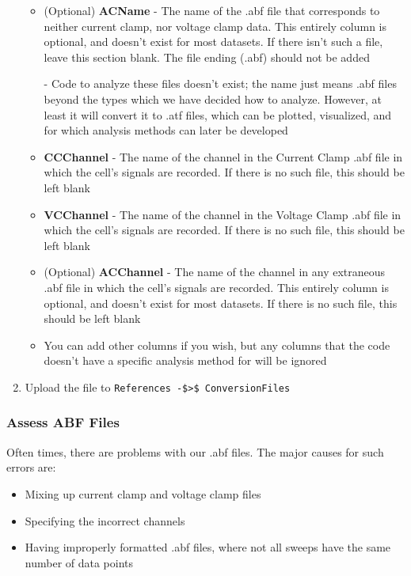 \documentclass{article}
\begin{document}
\begin{enumerate}
\begin{itemize}
        \item (Optional) \textbf{ACName} - The name of the .abf file that corresponds to neither current clamp, nor voltage clamp data. This entirely column is optional, and doesn't exist for most datasets. If there isn't such a file, leave this section blank. The file ending (.abf) should not be added
        
        - Code to analyze these files doesn't exist; the name just means .abf files beyond the types which we have decided how to analyze. However, at least it will convert it to .atf files, which can be plotted, visualized, and for which analysis methods can later be developed
        
        \item \textbf{CCChannel} - The name of the channel in the Current Clamp .abf file in which the cell’s signals are recorded. If there is no such file, this should be left blank
        
        \item \textbf{VCChannel} - The name of the channel in the Voltage Clamp .abf file in which the cell’s signals are recorded. If there is no such file, this should be left blank
        
        \item (Optional) \textbf{ACChannel} - The name of the channel in any extraneous .abf file in which the cell’s signals are recorded. This entirely column is optional, and doesn't exist for most datasets. If there is no such file, this should be left blank
        
        \item You can add other columns if you wish, but any columns that the code doesn't have a specific analysis method for will be ignored
    \end{itemize}
    \item Upload the file to \verb|References -$>$ ConversionFiles|
\end{enumerate}

\subsubsection{Assess ABF Files}

Often times, there are problems with our .abf files. The major causes for such errors are:
\begin{itemize}
    \item Mixing up current clamp and voltage clamp files
    
    \item Specifying the incorrect channels
    
    \item Having improperly formatted .abf files, where not all sweeps have the same number of data points
\end{itemize}
\end{document}
